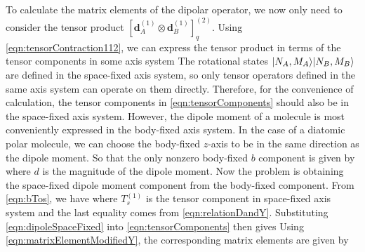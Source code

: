 To calculate the matrix elements of the dipolar operator, we now only need to consider the tensor product 
$\left[ \mathbf{d}_{A}^{(1)} \otimes \mathbf{d}_{B}^{(1)} \right]^{(2)}_{q}$. Using \autoref{eqn:tensorContraction112}, we can express the tensor product in terms of the tensor components in some axis system
The rotational states $| N_A, M_A \rangle| N_B, M_B \rangle$ are defined in the space-fixed axis system, so only tensor operators 
defined in the same axis system can operate on them directly. Therefore, for the convenience of calculation, the tensor 
components in \autoref{eqn:tensorComponents} should also be in the space-fixed axis system. 
However, the dipole moment of a molecule is
 most conveniently expressed in the body-fixed axis system. In the case of a diatomic polar molecule, we can choose
 the body-fixed $z$-axis to be in the same direction as the dipole moment.  So that the only nonzero body-fixed $b$ 
 component is given by
 where $d$ is the magnitude of the dipole moment. Now the problem is obtaining the space-fixed dipole moment
  component from the body-fixed component. From \autoref{eqn:bTos}, we have
where $T^{(1)}_{s }$ is the tensor component in space-fixed axis system and the last equality comes from \autoref{eqn:relationDandY}. Substituting \autoref{eqn:dipoleSpaceFixed} into  \autoref{eqn:tensorComponents}
then gives 
Using \autoref{eqn:matrixElementModifiedY}, the corresponding matrix elements are given by


